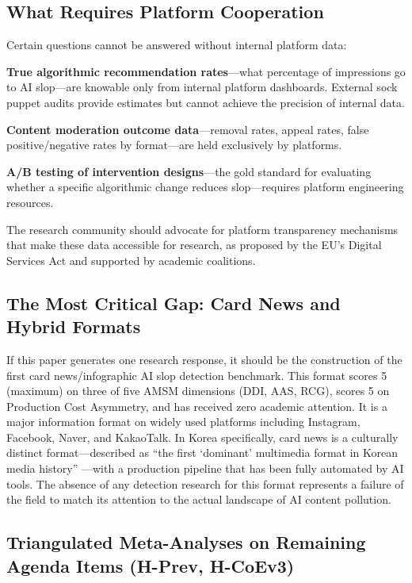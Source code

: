 \documentclass[12pt,a4paper]{article}
\begin{document}
\subsection{What Requires Platform Cooperation}

Certain questions cannot be answered without internal platform data:

\textbf{True algorithmic recommendation rates}---what percentage of impressions go to AI slop---are knowable only from internal platform dashboards. External sock puppet audits provide estimates but cannot achieve the precision of internal data.

\textbf{Content moderation outcome data}---removal rates, appeal rates, false positive/negative rates by format---are held exclusively by platforms.

\textbf{A/B testing of intervention designs}---the gold standard for evaluating whether a specific algorithmic change reduces slop---requires platform engineering resources.

The research community should advocate for platform transparency mechanisms that make these data accessible for research, as proposed by the EU's Digital Services Act and supported by academic coalitions.

\subsection{The Most Critical Gap: Card News and Hybrid Formats}

If this paper generates one research response, it should be the construction of the first card news/infographic AI slop detection benchmark. This format scores 5 (maximum) on three of five AMSM dimensions (DDI, AAS, RCG), scores 5 on Production Cost Asymmetry, and has received zero academic attention. It is a major information format on widely used platforms including Instagram, Facebook, Naver, and KakaoTalk. In Korea specifically, card news is a culturally distinct format---described as ``the first `dominant' multimedia format in Korean media history'' \parencite{Bae2018}---with a production pipeline that has been fully automated by AI tools. The absence of any detection research for this format represents a failure of the field to match its attention to the actual landscape of AI content pollution.

\subsection{Triangulated Meta-Analyses on Remaining Agenda Items (H-Prev, H-CoEv3)}
\label{sec:hprev_hcoev3_meta}
\end{document}
